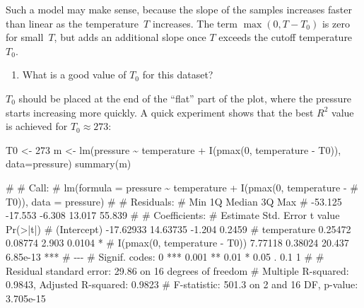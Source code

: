 \documentclass[
  a4paper,
]{article}
\newenvironment{Shaded}{\begin{snugshade}}{\end{snugshade}}
\newcommand{\AttributeTok}[1]{\textcolor[rgb]{0.77,0.63,0.00}{#1}}
\newcommand{\DecValTok}[1]{\textcolor[rgb]{0.00,0.00,0.81}{#1}}
\newcommand{\FunctionTok}[1]{\textcolor[rgb]{0.00,0.00,0.00}{#1}}
\newcommand{\NormalTok}[1]{#1}
\newcommand{\OtherTok}[1]{\textcolor[rgb]{0.56,0.35,0.01}{#1}}
\newcommand{\SpecialCharTok}[1]{\textcolor[rgb]{0.00,0.00,0.00}{#1}}
\providecommand{\tightlist}{%
  \setlength{\itemsep}{0pt}\setlength{\parskip}{0pt}}
\theoremstyle{definition}
\theoremstyle{definition}
\theoremstyle{definition}
\theoremstyle{definition}
\theoremstyle{remark}
\begin{document}
\begin{myanswers}
Such a model may make sense, because the slope of the
samples increases faster than linear as the temperature~\(T\)
increases. The term \(\max(0, T-T_0)\) is zero for small~\(T\),
but adds an additional slope once \(T\) exceeds the cutoff
temperature~\(T_0\).

\end{myanswers}

\begin{enumerate}
\def\labelenumi{\alph{enumi}.}
\setcounter{enumi}{2}
\tightlist
\item
  What is a good value of \(T_0\) for this dataset?
\end{enumerate}

\begin{myanswers}
\(T_0\) should be placed at the end of the ``flat'' part
of the plot, where the pressure starts increasing more
quickly. A quick experiment shows that the best \(R^2\)
value is achieved for \(T_0 \approx 273\):

\begin{Shaded}
\begin{Highlighting}[]
\NormalTok{T0 }\OtherTok{\textless{}{-}} \DecValTok{273}
\NormalTok{m }\OtherTok{\textless{}{-}} \FunctionTok{lm}\NormalTok{(pressure }\SpecialCharTok{\textasciitilde{}}\NormalTok{ temperature }\SpecialCharTok{+} \FunctionTok{I}\NormalTok{(}\FunctionTok{pmax}\NormalTok{(}\DecValTok{0}\NormalTok{, temperature }\SpecialCharTok{{-}}\NormalTok{ T0)),}
        \AttributeTok{data=}\NormalTok{pressure)}
\FunctionTok{summary}\NormalTok{(m)}
\end{Highlighting}
\end{Shaded}

\begin{Shaded}
\begin{Highlighting}[]
\NormalTok{\# }
\NormalTok{\# Call:}
\NormalTok{\# lm(formula = pressure \textasciitilde{} temperature + I(pmax(0, temperature {-} }
\NormalTok{\#     T0)), data = pressure)}
\NormalTok{\# }
\NormalTok{\# Residuals:}
\NormalTok{\#     Min      1Q  Median      3Q     Max }
\NormalTok{\# {-}53.125 {-}17.553  {-}6.308  13.017  55.839 }
\NormalTok{\# }
\NormalTok{\# Coefficients:}
\NormalTok{\#                               Estimate Std. Error t value Pr(\textgreater{}|t|)    }
\NormalTok{\# (Intercept)                  {-}17.62933   14.63735  {-}1.204   0.2459    }
\NormalTok{\# temperature                    0.25472    0.08774   2.903   0.0104 *  }
\NormalTok{\# I(pmax(0, temperature {-} T0))   7.77118    0.38024  20.437 6.85e{-}13 ***}
\NormalTok{\# {-}{-}{-}}
\NormalTok{\# Signif. codes:  0 \textquotesingle{}***\textquotesingle{} 0.001 \textquotesingle{}**\textquotesingle{} 0.01 \textquotesingle{}*\textquotesingle{} 0.05 \textquotesingle{}.\textquotesingle{} 0.1 \textquotesingle{} \textquotesingle{} 1}
\NormalTok{\# }
\NormalTok{\# Residual standard error: 29.86 on 16 degrees of freedom}
\NormalTok{\# Multiple R{-}squared:  0.9843,  Adjusted R{-}squared:  0.9823 }
\NormalTok{\# F{-}statistic: 501.3 on 2 and 16 DF,  p{-}value: 3.705e{-}15}
\end{Highlighting}
\end{Shaded}


\end{myanswers}
\end{document}
